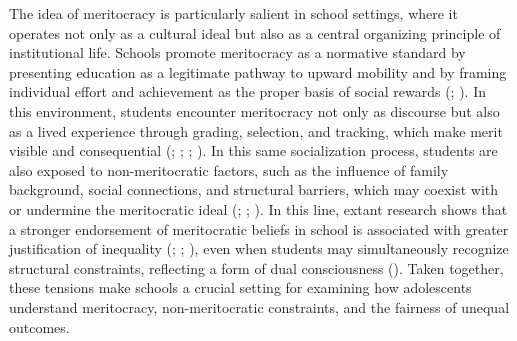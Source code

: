 \documentclass[
  13pt,
]{article}
\begin{document}
The idea of meritocracy is particularly salient in school settings,
where it operates not only as a cultural ideal but also as a central
organizing principle of institutional life. Schools promote meritocracy
as a normative standard by presenting education as a legitimate pathway
to upward mobility and by framing individual effort and achievement as
the proper basis of social rewards
(;
).
In this environment, students encounter meritocracy not only as
discourse but also as a lived experience through grading, selection, and
tracking, which make merit visible and consequential
(;
;
;
). In this same
socialization process, students are also exposed to non-meritocratic
factors, such as the influence of family background, social connections,
and structural barriers, which may coexist with or undermine the
meritocratic ideal (; ; ). In
this line, extant research shows that a stronger endorsement of
meritocratic beliefs in school is associated with greater justification
of inequality (;
;
), even
when students may simultaneously recognize structural constraints,
reflecting a form of dual consciousness (). Taken together, these tensions make schools a
crucial setting for examining how adolescents understand meritocracy,
non-meritocratic constraints, and the fairness of unequal outcomes.
\end{document}
